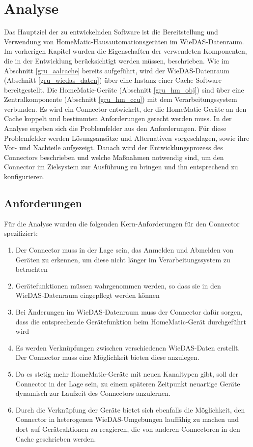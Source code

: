 \chapter{Analyse}
\label{analyse}

Das Hauptziel der zu entwickelnden Software ist die Bereitstellung und Verwendung von HomeMatic-Hausautomationsgeräten
im WieDAS-Datenraum.
Im vorherigen Kapitel wurden die Eigenschaften der verwendeten Komponenten, die in der Entwicklung berücksichtigt werden müssen,
beschrieben.
Wie im Abschnitt \ref{gru_aalcache} bereits aufgeführt, wird der WieDAS-Datenraum (Abschnitt \ref{gru_wiedas_daten})
über eine Instanz einer Cache-Software bereitgestellt.
Die HomeMatic-Geräte (Abschnitt \ref{gru_hm_obj}) sind über eine Zentralkomponente (Abschnitt \ref{gru_hm_ccu}) mit dem Verarbeitungssystem verbunden.
Es wird ein Connector entwickelt, der die HomeMatic-Geräte an den Cache koppelt und bestimmten Anforderungen
gerecht werden muss.
In der Analyse ergeben sich die Problemfelder aus den Anforderungen.
Für diese Problemfelder werden Lösungsansätze und Alternativen vorgeschlagen, sowie ihre Vor- und
Nachteile aufgezeigt.
Danach wird der Entwicklungsprozess des Connectors beschrieben und welche Maßnahmen notwendig sind, um den Connector
im Zielsystem zur Ausführung zu bringen und ihn entsprechend zu konfigurieren.

\section{Anforderungen}
\label{ana_anforderungen}

Für die Analyse wurden die folgenden Kern-Anforderungen für den Connector spezifiziert:
\begin{enumerate}
\item Der Connector muss in der Lage sein, das Anmelden und Abmelden von Geräten zu erkennen, um diese
nicht länger im Verarbeitungssystem zu betrachten
\item Gerätefunktionen müssen wahrgenommen werden, so dass sie in den WieDAS-Datenraum eingepflegt
werden können
\item Bei Änderungen im WieDAS-Datenraum muss der Connector dafür sorgen, dass die entsprechende
Gerätefunktion beim HomeMatic-Gerät durchgeführt wird
\item Es werden Verknüpfungen zwischen verschiedenen WieDAS-Daten erstellt. Der Connector muss
eine Möglichkeit bieten diese anzulegen.
\item Da es stetig mehr HomeMatic-Geräte mit neuen Kanaltypen gibt, soll der Connector in der Lage
sein, zu einem späteren Zeitpunkt neuartige Geräte dynamisch zur Laufzeit des Connectors anzulernen.
\item Durch die Verknüpfung der Geräte bietet sich ebenfalls die Möglichkeit, den Connector in heterogenen
WieDAS-Umgebungen lauffähig zu machen und dort auf Geräteaktionen zu reagieren, die von anderen
Connectoren in den Cache geschrieben werden.
\end{enumerate}

